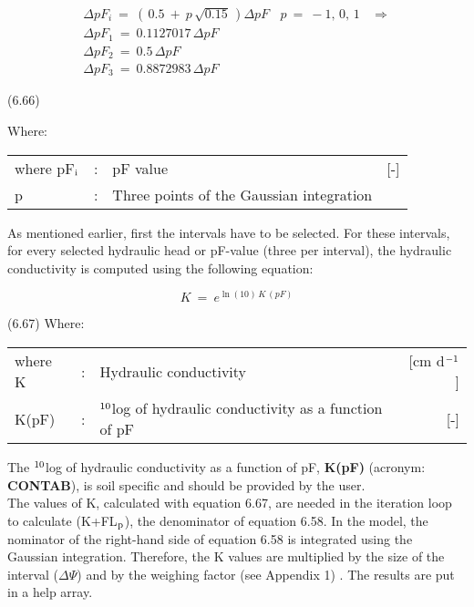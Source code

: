 \begin{eqnarray*}
\Delta pF _{i} ~=~ (\, 0.5 ~+~ p\, \sqrt{0.15} \, )\Delta pF ~~~~ p~=~ -1,\, 0,\, 1~~~~ \Rightarrow   \nonumber  \\
\Delta pF _{1} ~=~ 0.1127017\,\Delta pF  \nonumber  \\
\Delta pF _{2} ~=~ 0.5\,\Delta pF  \nonumber  \\
\Delta pF _{3} ~=~ 0.8872983\,\Delta pF
\end{eqnarray*}

 
\strut\hfill (6.66)




Where:\\
\begin{tabularx}{\textwidth}{llXr}



where pF$_{{\rm i}}$ &:& pF value  & [-]\\
p &:& Three points of the Gaussian integration
\end{tabularx}


As mentioned earlier, first the intervals have to be selected. For these intervals, for every
selected hydraulic head or pF-value (three per interval), the hydraulic conductivity is
computed using the following equation:

\begin{equation}
K~=~e ^{\ln (10)\, K\, (pF)} 
\end{equation}

 
\strut\hfill (6.67)
Where:\\
\begin{tabularx}{\textwidth}{llXr}



where K &:& Hydraulic conductivity  & [cm d$^{{\rm -1}}$]\\
K(pF) &:& $^{{\rm 10}}$log of hydraulic conductivity as a function of pF  & [-]
\end{tabularx}


The $^{{\rm 10}}$log of hydraulic conductivity as a function of pF, {\bf K(pF)} (acronym: {\bf CONTAB}), is
soil specific and should be provided by the user.\\
The values of K, calculated with equation 6.67, are needed in the iteration loop to
calculate (K+FL$_{{\rm p}}$), the denominator of equation 6.58. In the model, the nominator of the
right-hand side of equation 6.58 is integrated using the Gaussian integration. Therefore,
the K values are multiplied by the size of the interval ($\Delta$$\Psi$) and by the weighing factor
(see Appendix 1) . The results are put in a help array.



